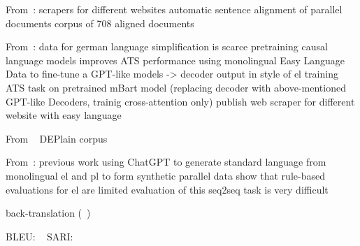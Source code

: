 From~\autocite{toborek2023new}:
scrapers for different websites
automatic sentence alignment of parallel documents
corpus of 708 aligned documents


From~\autocite{Ansch_tz_2023}:
data for german language simplification is scarce
pretraining causal language models improves ATS performance
using monolingual Easy Language Data to fine-tune a GPT-like models
-> decoder output in style of \gls{el}
training ATS task on pretrained mBart model (replacing decoder with above-mentioned GPT-like Decoders, trainig cross-attention only)
publish web scraper for different website with easy language

From ~\autocite{stodden-etal-2023-deplain}
DEPlain corpus

From~\autocite{klöser2024german}:
previous work
using ChatGPT to generate standard language from monolingual \gls{el} and \gls{pl} to form synthetic parallel data
show that rule-based evaluations for \gls{el} are limited
evaluation of this seq2seq task is very difficult

back-translation (~\autocite{sennrich-etal-2016-improving})





BLEU: ~\autocite{papineni-etal-2002-bleu}
SARI: ~\autocite{xu-etal-2016-optimizing}
